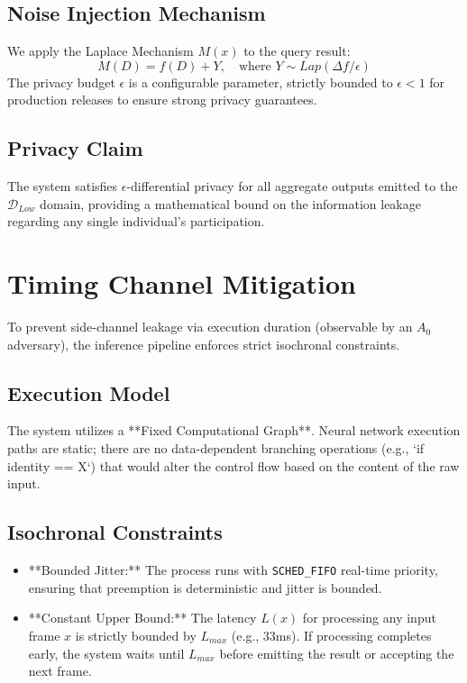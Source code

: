 \documentclass[conference]{IEEEtran}
\begin{document}
\subsection{Noise Injection Mechanism}
We apply the Laplace Mechanism $M(x)$ to the query result:
\begin{equation}
M(D) = f(D) + Y, \quad \text{where } Y \sim Lap(\Delta f / \epsilon)
\end{equation}
The privacy budget $\epsilon$ is a configurable parameter, strictly bounded to $\epsilon < 1$ for production releases to ensure strong privacy guarantees.

\subsection{Privacy Claim}
The system satisfies $\epsilon$-differential privacy for all aggregate outputs emitted to the $\mathcal{D}_{Low}$ domain, providing a mathematical bound on the information leakage regarding any single individual's participation.

\section{Timing Channel Mitigation}
To prevent side-channel leakage via execution duration (observable by an $A_0$ adversary), the inference pipeline enforces strict isochronal constraints.

\subsection{Execution Model}
The system utilizes a **Fixed Computational Graph**. Neural network execution paths are static; there are no data-dependent branching operations (e.g., `if identity == X`) that would alter the control flow based on the content of the raw input.

\subsection{Isochronal Constraints}
\begin{itemize}
    \item **Bounded Jitter:** The process runs with \texttt{SCHED\_FIFO} real-time priority, ensuring that preemption is deterministic and jitter is bounded.
    \item **Constant Upper Bound:** The latency $L(x)$ for processing any input frame $x$ is strictly bounded by $L_{max}$ (e.g., 33ms). If processing completes early, the system waits until $L_{max}$ before emitting the result or accepting the next frame.
\end{itemize}
\end{document}
